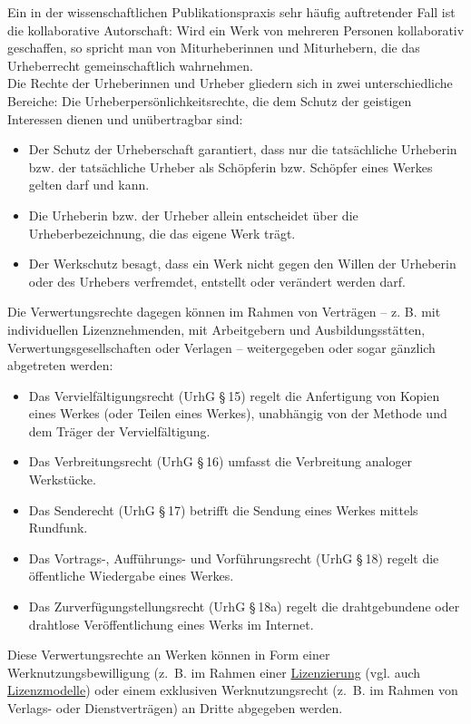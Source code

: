 \documentclass{article}
\begin{document}
        Ein in der wissenschaftlichen Publikationspraxis sehr häufig auftretender Fall ist die kollaborative Autorschaft: Wird ein Werk von mehreren Personen kollaborativ geschaffen, so spricht man von Miturheberinnen und Miturhebern, die das Urheberrecht gemeinschaftlich wahrnehmen.\\
            
        Die Rechte der Urheberinnen und Urheber gliedern sich in zwei unterschiedliche Bereiche: Die Urheberpersönlichkeitsrechte, die dem Schutz der geistigen Interessen dienen und unübertragbar sind:\\
            
        \begin{itemize}\item {Der Schutz der Urheberschaft garantiert, dass nur die tatsächliche Urheberin bzw. der tatsächliche Urheber als Schöpferin bzw. Schöpfer eines Werkes gelten darf und kann.  }\item {Die Urheberin bzw. der Urheber allein entscheidet über die Urheberbezeichnung, die das eigene Werk trägt.}\item {Der Werkschutz besagt, dass ein Werk nicht gegen den Willen der Urheberin oder des Urhebers verfremdet, entstellt oder verändert werden darf.}\end{itemize}Die Verwertungsrechte dagegen können im Rahmen von Verträgen – z. B. mit individuellen Lizenznehmenden, mit Arbeitgebern und Ausbildungsstätten, Verwertungsgesellschaften oder Verlagen  – weitergegeben oder sogar gänzlich abgetreten werden: \\
            
        \begin{itemize}\item {Das Vervielfältigungsrecht (UrhG § 15) regelt die Anfertigung von Kopien eines Werkes (oder Teilen eines Werkes), unabhängig von der Methode und dem Träger der Vervielfältigung.}\item {Das Verbreitungsrecht (UrhG § 16) umfasst die Verbreitung analoger Werkstücke. }\item {Das Senderecht (UrhG § 17) betrifft die Sendung eines Werkes mittels Rundfunk.}\item {Das Vortrags-, Aufführungs- und Vorführungsrecht (UrhG § 18) regelt die öffentliche Wiedergabe eines Werkes. }\item {Das Zurverfügungstellungsrecht (UrhG § 18a) regelt die drahtgebundene oder drahtlose Veröffentlichung eines Werks im Internet.}\end{itemize}Diese Verwertungsrechte an Werken können in Form einer Werknutzungsbewilligung (z. B. im Rahmen einer \href{http://gams.uni-graz.at/o:konde.119}{Lizenzierung} (vgl. auch \href{http://gams.uni-graz.at/o:konde.9}{Lizenzmodelle}) oder einem exklusiven Werknutzungsrecht (z. B. im Rahmen von Verlags- oder Dienstverträgen) an Dritte abgegeben werden.\\
            
\end{document}
